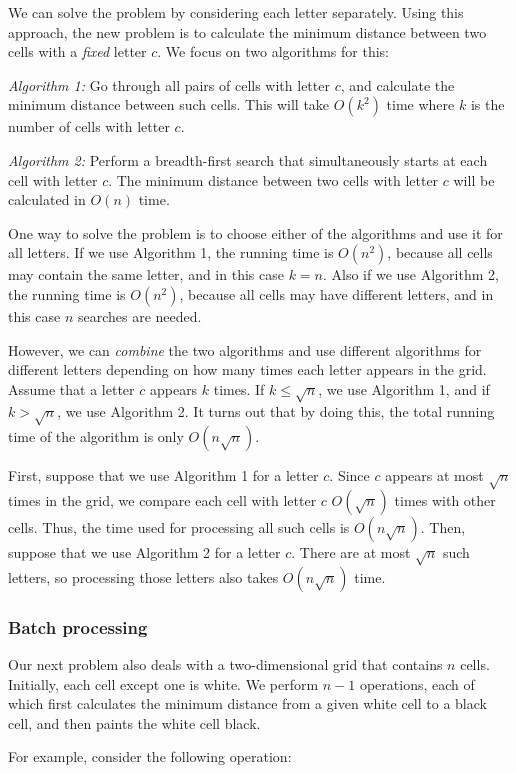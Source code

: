We can solve the problem by considering each letter separately.
Using this approach, the new problem is to calculate
the minimum distance
between two cells with a \emph{fixed} letter $c$.
We focus on two algorithms for this:

\emph{Algorithm 1:} Go through all pairs of cells with letter $c$,
and calculate the minimum distance between such cells.
This will take $O(k^2)$ time where $k$ is the number of cells with letter $c$.

\emph{Algorithm 2:} Perform a breadth-first search that simultaneously
starts at each cell with letter $c$. The minimum distance between
two cells with letter $c$ will be calculated in $O(n)$ time.

One way to solve the problem is to choose either of the
algorithms and use it for all letters.
If we use Algorithm 1, the running time is $O(n^2)$,
because all cells may contain the same letter,
and in this case $k=n$.
Also if we use Algorithm 2, the running time is $O(n^2)$,
because all cells may have different letters,
and in this case $n$ searches are needed.

However, we can \emph{combine} the two algorithms and
use different algorithms for different letters
depending on how many times each letter appears in the grid.
Assume that a letter $c$ appears $k$ times.
If $k \le \sqrt n$, we use Algorithm 1, and if $k > \sqrt n$,
we use Algorithm 2.
It turns out that by doing this, the total running time
of the algorithm is only $O(n \sqrt n)$.

First, suppose that we use Algorithm 1 for a letter $c$.
Since $c$ appears at most $\sqrt n$ times in the grid,
we compare each cell with letter $c$ $O(\sqrt n)$ times
with other cells.
Thus, the time used for processing all such cells is $O(n \sqrt n)$.
Then, suppose that we use Algorithm 2 for a letter $c$.
There are at most $\sqrt n$ such letters,
so processing those letters also takes $O(n \sqrt n)$ time.

\subsubsection{Batch processing}

Our next problem also deals with
a two-dimensional grid that contains $n$ cells.
Initially, each cell except one is white.
We perform $n-1$ operations, each of which first
calculates the minimum distance from a given white cell
to a black cell, and then paints the white cell black.

For example, consider the following operation:


